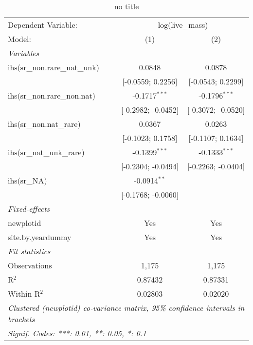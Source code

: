 
\begin{table}[htbp]
   \caption{no title}
   \centering
   \begin{tabular}{lcc}
      \tabularnewline \midrule \midrule
      Dependent Variable: & \multicolumn{2}{c}{log(live\_mass)}\\
      Model:                         & (1)                & (2)\\  
      \midrule
      \emph{Variables}\\
      ihs(sr\_non.rare\_nat\_unk)    & 0.0848             & 0.0878\\   
                                     & [-0.0559; 0.2256]  & [-0.0543; 0.2299]\\   
      ihs(sr\_non.rare\_non.nat)     & -0.1717$^{***}$    & -0.1796$^{***}$\\   
                                     & [-0.2982; -0.0452] & [-0.3072; -0.0520]\\   
      ihs(sr\_non.nat\_rare)         & 0.0367             & 0.0263\\   
                                     & [-0.1023; 0.1758]  & [-0.1107; 0.1634]\\   
      ihs(sr\_nat\_unk\_rare)        & -0.1399$^{***}$    & -0.1333$^{***}$\\   
                                     & [-0.2304; -0.0494] & [-0.2263; -0.0404]\\   
      ihs(sr\_NA)                    & -0.0914$^{**}$     &   \\   
                                     & [-0.1768; -0.0060] &   \\   
      \midrule
      \emph{Fixed-effects}\\
      newplotid                      & Yes                & Yes\\  
      site.by.yeardummy              & Yes                & Yes\\  
      \midrule
      \emph{Fit statistics}\\
      Observations                   & 1,175              & 1,175\\  
      R$^2$                          & 0.87432            & 0.87331\\  
      Within R$^2$                   & 0.02803            & 0.02020\\  
      \midrule \midrule
      \multicolumn{3}{l}{\emph{Clustered (newplotid) co-variance matrix, 95\% confidence intervals in brackets}}\\
      \multicolumn{3}{l}{\emph{Signif. Codes: ***: 0.01, **: 0.05, *: 0.1}}\\
   \end{tabular}
\end{table}


